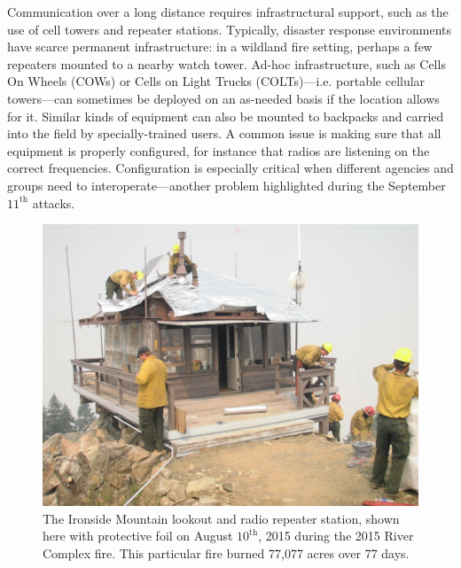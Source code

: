 \documentclass[]             %
{NASA}                       %
\theoremstyle{definition}
\begin{document}
Communication over a long distance requires infrastructural support,
such as the use of cell towers and repeater stations. Typically,
disaster response environments have scarce permanent infrastructure:
in a wildland fire setting, perhaps a few repeaters mounted to a
nearby watch tower. Ad-hoc infrastructure, such as Cells On Wheels
(COWs) or Cells on Light Trucks (COLTs)---i.e. portable cellular
towers---can sometimes be deployed on an as-needed basis if the
location allows for it. Similar kinds of equipment can also be mounted
to backpacks and carried into the field by specially-trained users. A
common issue is making sure that all equipment is properly configured,
for instance that radios are listening on the correct
frequencies. Configuration is especially critical when different
agencies and groups need to interoperate---another problem highlighted
during the September $11^\textrm{th}$ attacks.

\begin{figure}[t]
  \centering
  \includegraphics[scale=0.085]{images/ironside.jpg}
  \caption{The Ironside Mountain lookout and radio repeater station,
    shown here with protective foil on August $10^\textrm{th}$, 2015
    during the 2015 River Complex fire. This particular fire burned
    77,077 acres over 77 days.}
  \label{fig:ironside}
\end{figure}
\end{document}
